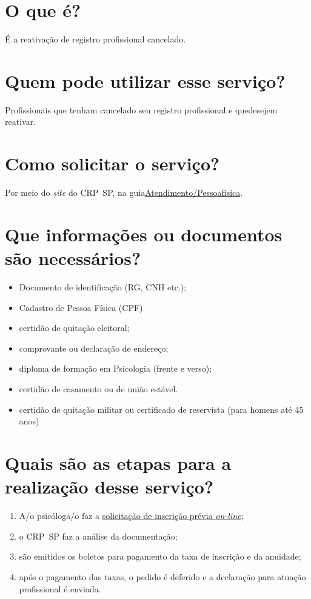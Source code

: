 \section{O que é?}

É a reativação de registro profissional cancelado.

\section{Quem pode utilizar esse serviço?}

Profissionais que tenham cancelado seu registro profissional e quedesejem reativar.

\section{Como solicitar o serviço?}

Por meio do \emph{site} do CRP~SP, na guia\href{https://www.crpsp.org/pagina/view/314}{Atendimento/Pessoafísica}.

\section{Que informações ou documentos são necessários?}

\begin{itemize}
  \item  Documento de identificação (RG, CNH etc.);
  \item  Cadastro de Pessoa Física (CPF)
  \item  certidão de quitação eleitoral;
  \item  comprovante ou declaração de endereço;
  \item  diploma de formação em Psicologia (frente e verso);
  \item  certidão de casamento ou de união estável.
  \item  certidão de quitação militar ou certificado de reservista (para homens  até 45 anos)
\end{itemize}

\section{Quais são as etapas para a realização desse serviço?}

\begin{enumerate}
  \item  A/o psicóloga/o faz a  \href{https://www.crpsp.org/pagina/view/314}{solicitação de inscrição  prévia \emph{on-line}};
  \item  o CRP~SP faz a análise da documentação;
  \item  são emitidos os boletos para pagamento da taxa de inscrição e da  anuidade;
  \item  após o pagamento das taxas, o pedido é deferido e a declaração para  atuação profissional é enviada.
\end{enumerate}

